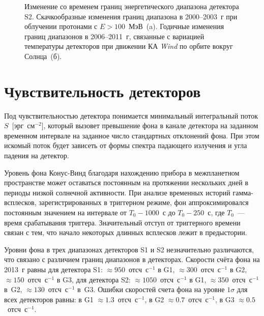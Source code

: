 \begin{figure}[h]
  \begin{minipage}[h]{0.5\textwidth}
  \end{minipage}
  \hfill
  \begin{minipage}[h]{0.5\textwidth}
  \end{minipage}
  \caption[Изменение со временем границ энергетического диапазона детектора S2 
  в 2000--2003~г и 2006--2011~г.]
  {Изменение со временем границ энергетического диапазона детектора S2. 
  Скачкообразные изменения границ диапазона в 2000--2003~г при облучении протонами с $E>100$~МэВ~(a). 
  Годичные изменения границ диапазонов в 2006--2011~г, связанные с вариацией температуры детекторов 
  при движении КА \textit{Wind} по орбите вокруг Солнца~(б).}
  \label{img:KW_E_boundaries_features}  
\end{figure}

\section{Чувствительность детекторов}
Под чувствительностью детектора понимается минимальный интегральный поток $S$~[эрг~см$^{-2}$], 
который вызовет превышение фона в канале детектора на заданном временном интервале 
на заданное число стандартных отклонений фона. При этом искомый поток будет зависеть 
от формы спектра падающего излучения и угла падения на детектор.

Уровень фона Конус-Винд благодаря нахождению прибора в межпланетном пространстве 
может оставаться постоянным на протяжении нескольких дней в периоды низкой 
солнечной активности. При анализе временных историй гамма-всплесков, 
зарегистрированных в триггерном режиме, фон аппроксимировался 
постоянным значением на интервале от $T_0 - 1000$~с до $T_0 - 250$~с, 
где $T_0$~--- время срабатывания триггера. Значительный отступ от триггерного 
времени связан с тем, что начало некоторых длинных всплесков лежит в предыстории. 

Уровни фона в трех диапазонах детекторов S1 и S2 незначительно различаются, 
что связано с различием границ диапазонов в детекторах. Скорости счёта фона 
на 2013~г равны для детектора S1: $\approx 950$~отсч~с$^{-1}$ в G1, 
$\approx 300$~отсч~с$^{-1}$ в G2, $\approx 150$~отсч~с$^{-1}$ в G3, 
для детектора S2: $\approx 1050$~отсч~с$^{-1}$ в G1, $\approx 350$~отсч~с$^{-1}$ в~G2, 
$\approx 130$~отсч~с$^{-1}$ в~G3. Ошибки скоростей счета фона на уровне $1 \sigma$ 
для всех детекторов равны: в G1 $\approx 1.3$~отсч~с$^{-1}$, в G2 $\approx 0.7$~отсч~с$^{-1}$, 
в G3 $\approx 0.5$~отсч~с$^{-1}$. 

